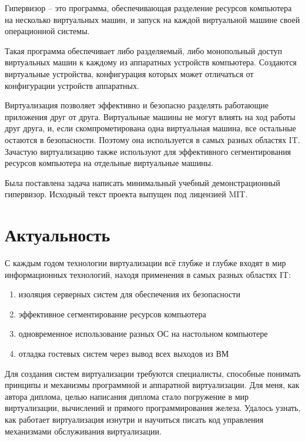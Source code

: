 \documentclass[a4paper,12pt]{extarticle}
\begin{document}
	Гипервизор -- это программа, обеспечивающая разделение ресурсов компьютера на несколько виртуальных машин, и запуск на каждой виртуальной машине своей операционной системы. \par
	Такая программа обеспечивает либо разделяемый, либо монопольный доступ виртуальных машин к каждому из аппаратных устройств компьютера. Создаются виртуальные устройства, конфигурация которых может отличаться от конфигурации устройств аппаратных.\par
	Виртуализация позволяет эффективно и безопасно разделять работающие приложения друг от друга. Виртуальные машины не могут влиять на ход работы друг друга, и, если скомпрометирована одна виртуальная машина, все остальные остаются в безопасности. Поэтому она используется в самых разных областях IT. Зачастую виртуализацию также используют для эффективного сегментирования ресурсов компьютера на отдельные виртуальные машины.\par
	Была поставлена задача написать минимальный учебный демонстрационный гипервизор. Исходный текст проекта выпущен под лицензией MIT.
	\section{Актуальность}
	С каждым годом технологии виртуализации всё глубже и глубже входят в мир информационных технологий, находя применения в самых разных областях IT:
	\begin{enumerate}
		\item изоляция серверных систем для обеспечения их безопасности
		\item эффективное сегментирование ресурсов компьютера
		\item одновременное использование разных ОС на настольном компьютере
		\item отладка гостевых систем через вывод всех выходов из ВМ
	\end{enumerate}
	\par Для создания систем виртуализации требуются специалисты, способные понимать принципы и механизмы программной и аппаратной виртуализации. Для меня, как автора диплома, целью написания диплома стало погружение в мир виртуализации, вычислений и прямого программирования железа. Удалось узнать, как работает виртуализация изнутри и научиться писать код управления механизмами обслуживания виртуализации. \par
\end{document}
